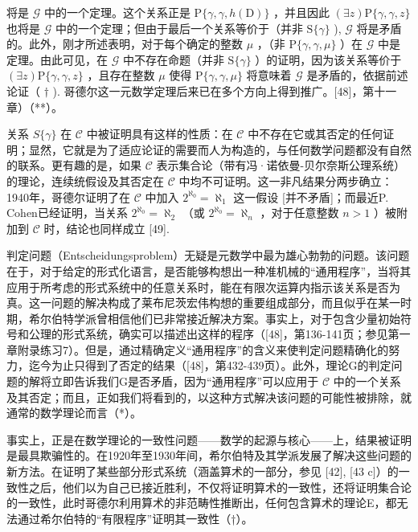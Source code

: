 将是 \(\mathcal{G}\) 中的一个定理。这个关系正是 \(\mathrm{P}\{\gamma, \gamma, h(\mathrm{D})\}\) ，并且因此 \((\exists z)\mathrm{P}\{\gamma, \gamma, z\}\) 也将是 \(\mathcal{G}\) 中的一个定理；但由于最后一个关系等价于（并非 \(\mathrm{S}\{\gamma\}\) ), \(\mathcal{G}\) 将是矛盾的。此外，刚才所述表明，对于每个确定的整数 \(\mu\) ，（非 \(\mathrm{P}\{\gamma, \gamma, \mu\}\) ）在 \(\mathcal{G}\) 中是定理。由此可见，在 \(\mathcal{G}\) 中不存在命题（并非 \(\mathrm{S}\{\gamma\}\) ）的证明，因为该关系等价于 \((\exists z)\mathrm{P}\{\gamma, \gamma, z\}\) ，且存在整数 \(\mu\) 使得 \(\mathrm{P}\{\gamma, \gamma, \mu\}\) 将意味着 \(\mathcal{G}\) 是矛盾的，依据前述论证（ \(\dagger\) ). 哥德尔这一元数学定理后来已在多个方向上得到推广。{[}48{]}，第十一章）（**）。

关系 \(S\{\gamma\}\) 在 \(\mathcal{C}\) 中被证明具有这样的性质：在 \(\mathcal{C}\) 中不存在它或其否定的任何证明；显然，它就是为了适应论证的需要而人为构造的，与任何数学问题都没有自然的联系。更有趣的是，如果 \(\mathcal{C}\) 表示集合论（带有冯·诺依曼-贝尔奈斯公理系统）的理论，连续统假设及其否定在 \(\mathcal{C}\) 中均不可证明。这一非凡结果分两步确立：1940年，哥德尔证明了在 \(\mathcal{C}\) 中加入 \(2^{\aleph_0} = \aleph_1\) 这一假设 {[}并不矛盾{]}；而最近P. Cohen已经证明，当关系 \(2^{\aleph_0} = \aleph_2\) （或 \(2^{\aleph_0} = \aleph_n\) ，对于任意整数 \(n > 1\) ）被附加到 \(\mathcal{C}\) 时，结论也同样成立 {[}49{]}.

判定问题（Entscheidungsproblem）无疑是元数学中最为雄心勃勃的问题。该问题在于，对于给定的形式化语言，是否能够构想出一种准机械的“通用程序”，当将其应用于所考虑的形式系统中的任意关系时，能在有限次运算内指示该关系是否为真。这一问题的解决构成了莱布尼茨宏伟构想的重要组成部分，而且似乎在某一时期，希尔伯特学派曾相信他们已非常接近解决方案。事实上，对于包含少量初始符号和公理的形式系统，确实可以描述出这样的程序（{[}48{]}，第136-141页；参见第一章附录练习7）。但是，通过精确定义“通用程序”的含义来使判定问题精确化的努力，迄今为止只得到了否定的结果（{[}48{]}，第432-439页）。此外，理论G的判定问题的解将立即告诉我们G是否矛盾，因为“通用程序”可以应用于 \(\mathcal{C}\) 中的一个关系及其否定；而且，正如我们将看到的，以这种方式解决该问题的可能性被排除，就通常的数学理论而言（*）。

事实上，正是在数学理论的一致性问题——数学的起源与核心——上，结果被证明是最具欺骗性的。在1920年至1930年间，希尔伯特及其学派发展了解决这些问题的新方法。在证明了某些部分形式系统（涵盖算术的一部分，参见 {[}42{]}, {[}43 c{]}）的一致性之后，他们以为自己已接近胜利，不仅将证明算术的一致性，还将证明集合论的一致性，此时哥德尔利用算术的非范畴性推断出，任何包含算术的理论E，都无法通过希尔伯特的“有限程序”证明其一致性（†）。

